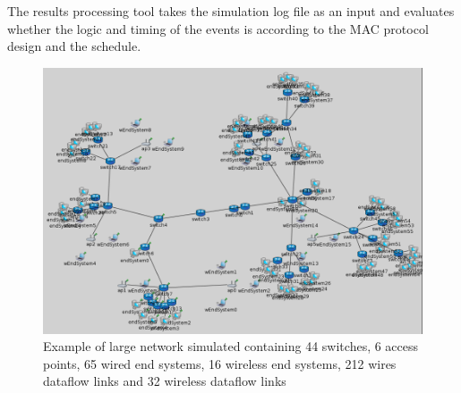 \documentclass[conference]{IEEEtran}
\begin{document}
The results processing tool takes the simulation log file as an input and evaluates whether the logic and timing of the events is according to the MAC protocol design and the schedule.









\begin{figure}[h]
	\centerline{\includegraphics[keepaspectratio=true, width=16cm] {figures/s1-3}}
	\caption{Example of large network simulated containing 44 switches, 6 access points, 65 wired end systems, 16 wireless end systems, 212 wires dataflow links and 32 wireless dataflow links}
	\label{fig:s1-3}
\end{figure}
\end{document}
